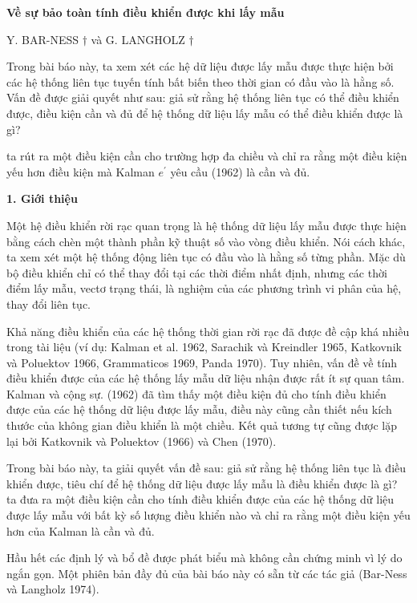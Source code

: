 \documentclass[12pt,a4paper]{article}
\begin{document}
	\fontsize{14pt}{22pt}\selectfont


\begin{center}
	\textbf{Về sự bảo toàn tính điều khiển được khi lấy mẫu}
\end{center}

\begin{center}
	Y. BAR-NESS $\dagger$ và G. LANGHOLZ $\dagger$
\end{center}

Trong bài báo này, ta xem xét các hệ dữ liệu được lấy mẫu được thực hiện bởi các hệ thống liên tục tuyến tính bất biến theo thời gian có đầu vào là hằng số. Vấn đề được giải quyết như sau: giả sử rằng hệ thống liên tục có thể điều khiển được, điều kiện cần và đủ để hệ thống dữ liệu lấy mẫu có thể điều khiển được là gì?

ta rút ra một điều kiện cần cho trường hợp đa chiều và chỉ ra rằng một điều kiện yếu hơn điều kiện mà Kalman $e^{\prime}$ yêu cầu (1962) là cần và đủ.


\textbf{1. Giới thiệu}

Một hệ điều khiển rời rạc quan trọng là hệ thống dữ liệu lấy mẫu được thực hiện bằng cách chèn một thành phần kỹ thuật số vào vòng điều khiển. Nói cách khác, ta xem xét một hệ thống động liên tục có đầu vào là hằng số từng phần. Mặc dù bộ điều khiển chỉ có thể thay đổi tại các thời điểm nhất định, nhưng các thời điểm lấy mẫu, vectơ trạng thái, là nghiệm của các phương trình vi phân của hệ, thay đổi liên tục.

Khả năng điều khiển của các hệ thống thời gian rời rạc đã được đề cập khá nhiều trong tài liệu (ví dụ: Kalman et al. 1962, Sarachik và Kreindler 1965, Katkovnik và Poluektov 1966, Grammaticos 1969, Panda 1970). Tuy nhiên, vấn đề về tính điều khiển được của các hệ thống lấy mẫu dữ liệu nhận được rất ít sự quan tâm. Kalman và cộng sự. (1962) đã tìm thấy một điều kiện đủ cho tính điều khiển được của các hệ thống dữ liệu được lấy mẫu, điều này cũng cần thiết nếu kích thước của không gian điều khiển là một chiều. Kết quả tương tự cũng được lặp lại bởi Katkovnik và Poluektov (1966) và Chen (1970).

Trong bài báo này, ta giải quyết vấn đề sau: giả sử rằng hệ thống liên tục là điều khiển được, tiêu chí để hệ thống dữ liệu được lấy mẫu là điều khiển được là gì? ta đưa ra một điều kiện cần  cho tính điều khiển được của các hệ thống dữ liệu được lấy mẫu với bất kỳ số lượng điều khiển nào và chỉ ra rằng một điều kiện yếu hơn của Kalman là cần và đủ.

Hầu hết các định lý và bổ đề được phát biểu mà không cần chứng minh vì lý do ngắn gọn. Một phiên bản đầy đủ của bài báo này có sẵn từ các tác giả (Bar-Ness và Langholz 1974).
\end{document}
